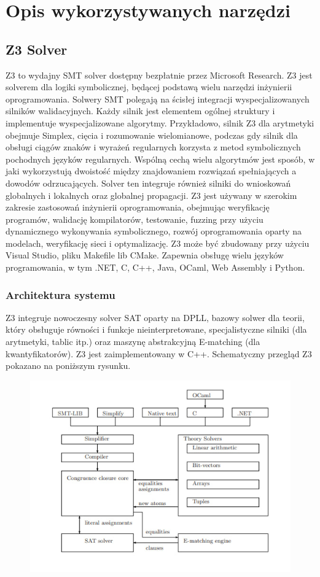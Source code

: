 

\chapter{Opis wykorzystywanych narzędzi}

\section{Z3 Solver}
Z3 to wydajny SMT solver dostępny bezpłatnie przez Microsoft Research. Z3 jest solverem dla logiki symbolicznej, będącej podstawą wielu narzędzi inżynierii oprogramowania. Solwery SMT polegają na ścisłej integracji wyspecjalizowanych silników walidacyjnych. Każdy silnik jest elementem ogólnej struktury i implementuje wyspecjalizowane algorytmy. Przykładowo, silnik Z3 dla arytmetyki obejmuje Simplex, cięcia i rozumowanie wielomianowe, podczas gdy silnik dla obsługi ciągów znaków i wyrażeń regularnych korzysta z metod symbolicznych pochodnych języków regularnych. Wspólną cechą wielu algorytmów jest sposób, w jaki wykorzystują dwoistość między znajdowaniem rozwiązań spełniających a dowodów odrzucających. Solver ten integruje również silniki do wnioskowań globalnych i lokalnych oraz globalnej propagacji.
Z3 jest używany w szerokim zakresie zastosowań inżynierii oprogramowania, obejmując weryfikację programów, walidację kompilatorów, testowanie, fuzzing przy użyciu dynamicznego wykonywania symbolicznego, rozwój oprogramowania oparty na modelach, weryfikację sieci i optymalizację.
Z3 może być zbudowany przy użyciu Visual Studio, pliku Makefile lib CMake. Zapewnia obsługę wielu języków programowania, w tym .NET, C, C++, Java, OCaml, Web Assembly i Python.

\subsection{Architektura systemu}
	
Z3 integruje nowoczesny solver SAT oparty na DPLL, bazowy solwer dla teorii, który obsługuje równości i funkcje nieinterpretowane, specjalistyczne silniki (dla arytmetyki, tablic itp.) oraz maszynę abstrakcyjną E-matching (dla kwantyfikatorów). Z3 jest zaimplementowany w C++. Schematyczny przegląd Z3 pokazano na poniższym rysunku.

	\begin{figure}
		\centering
		\includegraphics[width=0.7\linewidth]{screenshot001}
		\caption{}
		\label{fig:screenshot001}
	\end{figure}

